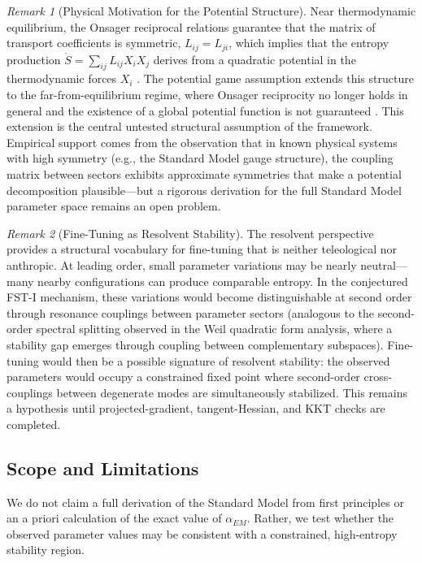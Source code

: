 \documentclass[12pt,a4paper]{article}
\theoremstyle{remark}
\newtheorem{remark}{Remark}
\begin{document}
\begin{remark}[Physical Motivation for the Potential Structure]
\label{rem:potential-motivation}
Near thermodynamic equilibrium, the Onsager reciprocal relations guarantee that the matrix of transport coefficients is symmetric, $L_{ij} = L_{ji}$, which implies that the entropy production $\dot{S} = \sum_{ij} L_{ij} X_i X_j$ derives from a quadratic potential in the thermodynamic forces $X_i$ \citep{Prigogine1967}. The potential game assumption extends this structure to the far-from-equilibrium regime, where Onsager reciprocity no longer holds in general and the existence of a global potential function is not guaranteed \citep{GrinsteinLinsker2007}. This extension is the central untested structural assumption of the framework. Empirical support comes from the observation that in known physical systems with high symmetry (e.g., the Standard Model gauge structure), the coupling matrix between sectors exhibits approximate symmetries that make a potential decomposition plausible---but a rigorous derivation for the full Standard Model parameter space remains an open problem.
\end{remark}

\begin{remark}[Fine-Tuning as Resolvent Stability]
\label{rem:fine-tuning-resolvent}
The resolvent perspective \citep{GeigerRH2026b} provides a structural vocabulary for fine-tuning that is neither teleological nor anthropic. At leading order, small parameter variations may be nearly neutral---many nearby configurations can produce comparable entropy. In the conjectured FST-I mechanism, these variations would become distinguishable at second order through resonance couplings between parameter sectors (analogous to the second-order spectral splitting observed in the Weil quadratic form analysis, where a stability gap emerges through coupling between complementary subspaces). Fine-tuning would then be a possible signature of resolvent stability: the observed parameters would occupy a constrained fixed point where second-order cross-couplings between degenerate modes are simultaneously stabilized. This remains a hypothesis until projected-gradient, tangent-Hessian, and KKT checks are completed.
\end{remark}

\subsection{Scope and Limitations}

We do not claim a full derivation of the Standard Model from first principles or an a priori calculation of the exact value of $\alpha_{EM}$. Rather, we test whether the observed parameter values may be consistent with a constrained, high-entropy stability region.
\end{document}
